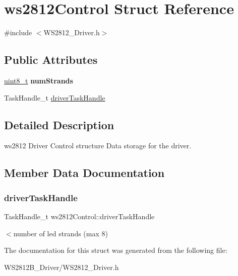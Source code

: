 \hypertarget{structws2812Control}{}\section{ws2812\+Control Struct Reference}
\label{structws2812Control}


{\ttfamily \#include $<$W\+S2812\+\_\+\+Driver.\+h$>$}

\subsection*{Public Attributes}
\begin{DoxyCompactItemize}
\item 
\mbox{\label{structws2812Control_aaf8824a512ba31b031af1e23d51b8a10}} 
\hyperlink{vl53l0x__types_8h_aba7bc1797add20fe3efdf37ced1182c5}{uint8\+\_\+t} {\bfseries num\+Strands}
\item 
Task\+Handle\+\_\+t \hyperlink{structws2812Control_acd4a5c56881f521730e3401e23127f4c}{driver\+Task\+Handle}
\end{DoxyCompactItemize}


\subsection{Detailed Description}
ws2812 Driver Control structure Data storage for the driver. 

\subsection{Member Data Documentation}
\mbox{\label{structws2812Control_acd4a5c56881f521730e3401e23127f4c}} 
\subsubsection{\texorpdfstring{driver\+Task\+Handle}{driverTaskHandle}}
{\footnotesize\ttfamily Task\+Handle\+\_\+t ws2812\+Control\+::driver\+Task\+Handle}

$<$number of led strands (max 8) 

The documentation for this struct was generated from the following file\+:\begin{DoxyCompactItemize}
\item 
W\+S2812\+B\+\_\+\+Driver/W\+S2812\+\_\+\+Driver.\+h\end{DoxyCompactItemize}
